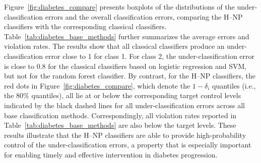Figure~\ref{fig:diabetes_compare} presents boxplots of the distributions of the under-classification errors and the overall classification errors, comparing the H--NP classifiers with the corresponding classical classifiers.  Table~\ref{tab:diabetes_base_methods} further summarizes the average errors and violation rates. The results show that all classical classifiers produce an under-classification error close to 1 for class 1. For class 2, the under-classification error is close to $0.8$ for the classical classifiers based on logistic regression and SVM, but not for the random forest classifier. By contrast, for the H--NP classifiers, the red dots in Figure~\ref{fig:diabetes_compare}, which denote the \(1-\delta_i\) quantiles (i.e., the \(80\%\) quantiles), all lie at or below the corresponding target control levels indicated by the black dashed lines for all under-classification errors across all base classification methods. Correspondingly, all violation rates reported in Table~\ref{tab:diabetes_base_methods} are also below the target levels. These results illustrate that the H--NP classifiers are able to provide high-probability control of the under-classification errors, a property that is especially important for enabling timely and effective intervention in diabetes progression.









